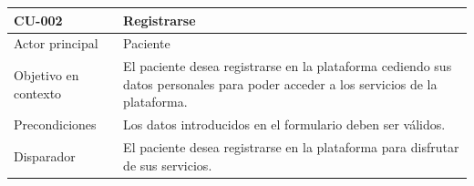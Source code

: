 \begin{table}[htpb]
\centering
\begin{tabularx}{\textwidth}{|l|X|}
\hline
\textbf{CU-002}                            & \textbf{Registrarse}                                                                                                                                                                                                                                                                                                                                                                                                                    \\ \hline
Actor principal                   & Paciente                                                                                                                                                                                                                                                                                                                                                                                                                        \\ \hline
Objetivo en contexto              & El paciente desea registrarse en la plataforma cediendo sus datos personales para poder acceder a los servicios de la plataforma.                                                                                                                                                                                                                                                                                                 \\ \hline
Precondiciones                    & Los datos introducidos en el formulario deben ser válidos.                                                                                                                                                                                                                                                                                                                                                                     \\ \hline
Disparador                        & El paciente desea registrarse en la plataforma para disfrutar de sus servicios.                                                                                                                                                                                                                                                                                                                                                   \\ \hline

\end{tabularx}
\end{table}
